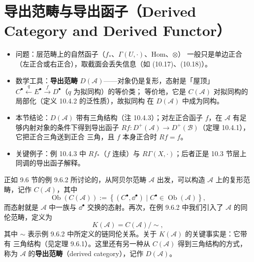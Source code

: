 \section{导出范畴与导出函子（Derived Category and Derived Functor）}

\begin{keytakeaways}
\begin{itemize}
  \item 问题：层范畴上的自然函子（$f_\ast$、$\Gamma(U,\cdot)$、$\mathrm{Hom}$、$\otimes$）
        一般只是单边正合（左正合或右正合），取截面会丢失信息（如 (10.17)、(10.18)）。
  \item 数学工具：\textbf{导出范畴} $D(\mathcal A)$——对象仍是复形，态射是「屋顶」
        $C^\bullet\xleftarrow{q}E^\bullet\xrightarrow{f}D^\bullet$（$q$ 为拟同构）的等价类；
        等价地，它是 $C(\mathcal A)$ 对拟同构的局部化（定义 10.4.2 的泛性质），故拟同构
        在 $D(\mathcal A)$ 中成为同构。
  \item 本节结论：$D(\mathcal A)$ 带有三角结构（注 10.4.3）；对左正合函子 $f$，在
        $\mathcal A$ 有足够内射对象的条件下得到导出函子
        $Rf:D^+(\mathcal A)\to D^+(\mathcal B)$（定理 10.4.1），它把正合三角送到正合
        三角，且 $f$ 本身正合时 $Rf=f$。
  \item 关键例子：例 10.4.3 中 $Rf_\ast$（$f$ 连续）与 $R\Gamma(X,\cdot)$；后者正是
        10.3 节层上同调的导出函子解释。
\end{itemize}
\end{keytakeaways}

正如 9.6 节的例 9.6.2 所讨论的，从阿贝尔范畴 $\mathcal A$ 出发，可以构造 $\mathcal A$
上的复形范畴，记作 $C(\mathcal A)$，其中
\[
\operatorname{Ob}(C(\mathcal A)):=
\left\{(C^\bullet,\dd^\bullet)\mid C^\bullet\in\operatorname{Ob}(\mathcal A)\right\},
\]
而态射就是 $\mathcal A$ 中一族与 $\dd^\bullet$ 交换的态射。再次，在例 9.6.2 中我们引入了
$\mathcal A$ 的同伦范畴，定义为
\[
K(\mathcal A)=C(\mathcal A)\big/\sim,
\]
其中 $\sim$ 表示例 9.6.2 中所定义的链同伦关系。关于 $K(\mathcal A)$ 的关键事实是：它带有
三角结构（见定理 9.6.1）。这里还有另一种从 $C(\mathcal A)$ 得到三角结构的方式，称为
$\mathcal A$ 的\textbf{导出范畴}（derived category），记作 $D(\mathcal A)$。

